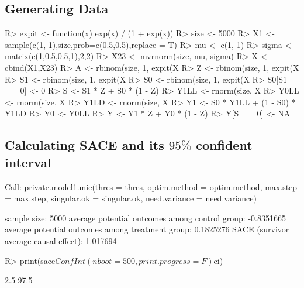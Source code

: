 \documentclass[article]{jss}
\begin{document}
\subsection{Generating Data}
\begin{CodeChunk}
  \begin{CodeInput}
R> expit <- function(x) { exp(x) / (1 + exp(x)) }
R> size <- 5000
R> X1 <- sample(c(1,-1),size,prob=c(0.5,0.5),replace = T)
R> mu <- c(1,-1)
R> sigma <- matrix(c(1,0.5,0.5,1),2,2)
R> X23 <- mvrnorm(size, mu, sigma)
R> X <- cbind(X1,X23)
R> A <- rbinom(size, 1, expit(X %
R> Z <- rbinom(size, 1, expit(X %
R> S1 <- rbinom(size, 1, expit(X %
R> S0 <- rbinom(size, 1, expit(X %
R> S0[S1 == 0] <- 0
R> S <- S1 * Z + S0 * (1 - Z)
R> Y1LL <- rnorm(size, X %
R> Y0LL <- rnorm(size, X %
R> Y1LD <- rnorm(size, X %
R> Y1 <- S0 * Y1LL + (1 - S0) * Y1LD
R> Y0 <- Y0LL
R> Y <- Y1 * Z + Y0 * (1 - Z)
R> Y[S == 0] <- NA
  \end{CodeInput}
\end{CodeChunk}

\subsection{Calculating SACE and its $95\%$ confident interval}
\begin{CodeChunk}
  \begin{CodeOutput}
Call:
private.model1.mie(thres = thres, optim.method = optim.method, 
    max.step = max.step, singular.ok = singular.ok, need.variance = need.variance)

sample size: 5000 
average potential outcomes among control group: -0.8351665  
average potential outcomes among treatment group: 0.1825276  
SACE (survivor average causal effect): 1.017694 
  \end{CodeOutput}
  \begin{CodeInput}
R> print(sace$ConfInt(nboot=500,print.progress = F)$ci)
  \end{CodeInput}
  \begin{CodeOutput}
          [,1]
2.5%
97.5%
  \end{CodeOutput}
\end{CodeChunk}
\end{document}
